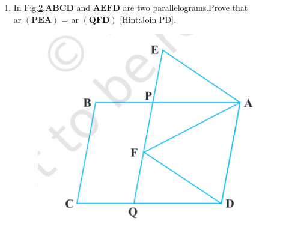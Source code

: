 \documentclass[12pt]{article}
\let\vec\mathbf
\begin{document}
\begin{enumerate}
\begin{figure}[h]
	\caption{}
	\label{fig:9.26}
\end{figure}
\newpage
\item In Fig.\ref{fig:9.27},$\vec{ABCD}$ and $\vec{AEFD}$ are two parallelograms.Prove that \\ ar $\vec{(PEA)}$ = ar $\vec{(QFD)}$  [Hint:Join PD].
\begin{figure}[h]
	\centering
	\includegraphics[width=\columnwidth]{Figs/Fig9.27.png}
	\caption{}
	\label{fig:9.27}
\end{figure}
\end{enumerate}
\end{document}
